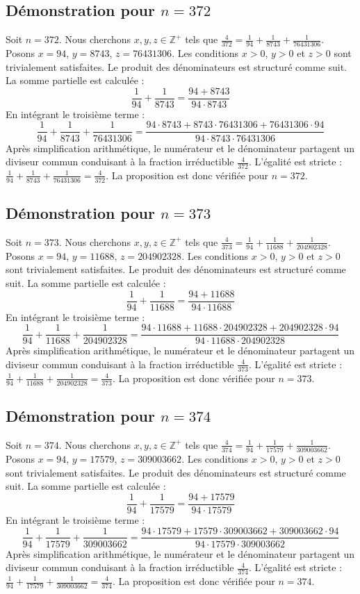 \documentclass[11pt,a4paper]{article}
\begin{document}
\subsection{Démonstration pour $n = 372$}
Soit $n = 372$. Nous cherchons $x, y, z \in \mathbb{Z}^{+}$ tels que $\frac{4}{372} = \frac{1}{94} + \frac{1}{8743} + \frac{1}{76431306}$.
Posons $x = 94$, $y = 8743$, $z = 76431306$.
Les conditions $x > 0$, $y > 0$ et $z > 0$ sont trivialement satisfaites.
Le produit des dénominateurs est structuré comme suit. La somme partielle est calculée :
$$ \frac{1}{94} + \frac{1}{8743} = \frac{94+8743}{94 \cdot 8743} $$
En intégrant le troisième terme :
$$ \frac{1}{94} + \frac{1}{8743} + \frac{1}{76431306} = \frac{94 \cdot 8743 + 8743 \cdot 76431306 + 76431306 \cdot 94}{94 \cdot 8743 \cdot 76431306} $$
Après simplification arithmétique, le numérateur et le dénominateur partagent un diviseur commun conduisant à la fraction irréductible $\frac{4}{372}$.
L'égalité est stricte : $\frac{1}{94} + \frac{1}{8743} + \frac{1}{76431306} = \frac{4}{372}$.
La proposition est donc vérifiée pour $n = 372$.
\subsection{Démonstration pour $n = 373$}
Soit $n = 373$. Nous cherchons $x, y, z \in \mathbb{Z}^{+}$ tels que $\frac{4}{373} = \frac{1}{94} + \frac{1}{11688} + \frac{1}{204902328}$.
Posons $x = 94$, $y = 11688$, $z = 204902328$.
Les conditions $x > 0$, $y > 0$ et $z > 0$ sont trivialement satisfaites.
Le produit des dénominateurs est structuré comme suit. La somme partielle est calculée :
$$ \frac{1}{94} + \frac{1}{11688} = \frac{94+11688}{94 \cdot 11688} $$
En intégrant le troisième terme :
$$ \frac{1}{94} + \frac{1}{11688} + \frac{1}{204902328} = \frac{94 \cdot 11688 + 11688 \cdot 204902328 + 204902328 \cdot 94}{94 \cdot 11688 \cdot 204902328} $$
Après simplification arithmétique, le numérateur et le dénominateur partagent un diviseur commun conduisant à la fraction irréductible $\frac{4}{373}$.
L'égalité est stricte : $\frac{1}{94} + \frac{1}{11688} + \frac{1}{204902328} = \frac{4}{373}$.
La proposition est donc vérifiée pour $n = 373$.
\subsection{Démonstration pour $n = 374$}
Soit $n = 374$. Nous cherchons $x, y, z \in \mathbb{Z}^{+}$ tels que $\frac{4}{374} = \frac{1}{94} + \frac{1}{17579} + \frac{1}{309003662}$.
Posons $x = 94$, $y = 17579$, $z = 309003662$.
Les conditions $x > 0$, $y > 0$ et $z > 0$ sont trivialement satisfaites.
Le produit des dénominateurs est structuré comme suit. La somme partielle est calculée :
$$ \frac{1}{94} + \frac{1}{17579} = \frac{94+17579}{94 \cdot 17579} $$
En intégrant le troisième terme :
$$ \frac{1}{94} + \frac{1}{17579} + \frac{1}{309003662} = \frac{94 \cdot 17579 + 17579 \cdot 309003662 + 309003662 \cdot 94}{94 \cdot 17579 \cdot 309003662} $$
Après simplification arithmétique, le numérateur et le dénominateur partagent un diviseur commun conduisant à la fraction irréductible $\frac{4}{374}$.
L'égalité est stricte : $\frac{1}{94} + \frac{1}{17579} + \frac{1}{309003662} = \frac{4}{374}$.
La proposition est donc vérifiée pour $n = 374$.
\end{document}
